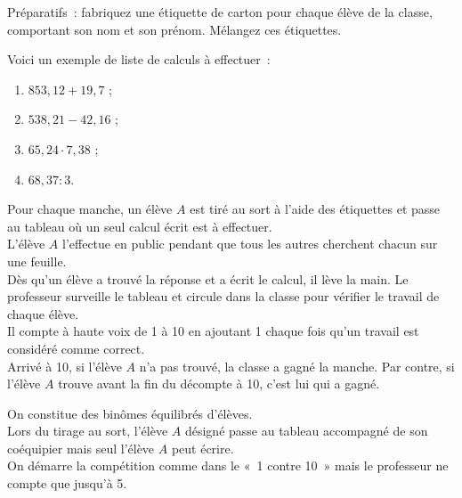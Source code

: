 \begin{TP}
Préparatifs : fabriquez une étiquette de carton pour chaque élève de la classe, comportant son nom et son prénom. Mélangez ces étiquettes.

Voici un exemple de liste de calculs à effectuer :
\begin{enumerate}
 \item $853,12 + 19,7$ ;
 \item $538,21 - 42,16$ ;
 \item $65,24 \cdot 7,38$ ;
 \item $68,37 : 3$.
 \end{enumerate}

Pour chaque manche, un élève $A$ est tiré au sort à l'aide des étiquettes et passe au tableau où un seul calcul écrit est à effectuer. \\[0.5em]
L'élève $A$ l'effectue en public pendant que tous les autres cherchent chacun sur une feuille. \\[0.5em]
Dès qu'un élève a trouvé la réponse et a écrit le calcul, il lève la main. Le professeur surveille le tableau et circule dans la classe pour vérifier le travail de chaque élève. \\[0.5em]
Il compte à haute voix de 1 à 10 en ajoutant 1 chaque fois qu'un travail est considéré comme correct. \\[0.5em]
Arrivé à 10, si l'élève $A$ n'a pas trouvé, la classe a gagné la manche. Par contre, si l'élève $A$ trouve avant la fin du décompte à 10, c'est lui qui a gagné.

On constitue des binômes équilibrés d'élèves.\\[0.5em]
Lors du tirage au sort, l'élève $A$ désigné passe au tableau accompagné de son coéquipier mais seul l'élève $A$ peut écrire. \\[0.5em]
On démarre la compétition comme dans le « 1 contre 10 » mais le professeur ne compte que jusqu'à 5. 
\end{TP}